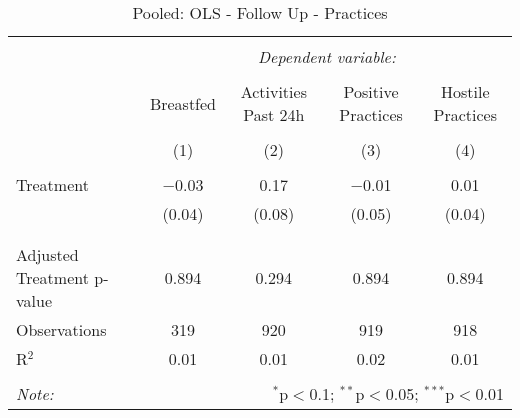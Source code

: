 
\begin{table}[!htbp] \centering 
  \caption{Pooled: OLS - Follow Up - Practices} 
  \label{tbl:Pooled: OLS - Follow Up - Practices} 
\begin{tabular}{@{\extracolsep{5pt}}lcccc} 
\\[-1.8ex]\hline 
\hline \\[-1.8ex] 
 & \multicolumn{4}{c}{\textit{Dependent variable:}} \\ 
\cline{2-5} 
\\[-1.8ex] & Breastfed & Activities Past 24h & Positive Practices & Hostile Practices \\ 
\\[-1.8ex] & (1) & (2) & (3) & (4)\\ 
\hline \\[-1.8ex] 
 Treatment & $-$0.03 & 0.17 & $-$0.01 & 0.01 \\ 
  & (0.04) & (0.08) & (0.05) & (0.04) \\ 
  & & & & \\ 
\hline \\[-1.8ex] 
Adjusted Treatment p-value & 0.894 & 0.294 & 0.894 & 0.894 \\ 
Observations & 319 & 920 & 919 & 918 \\ 
R$^{2}$ & 0.01 & 0.01 & 0.02 & 0.01 \\ 
\hline 
\hline \\[-1.8ex] 
\textit{Note:}  & \multicolumn{4}{r}{$^{*}$p$<$0.1; $^{**}$p$<$0.05; $^{***}$p$<$0.01} \\ 
\end{tabular} 
\end{table} 
